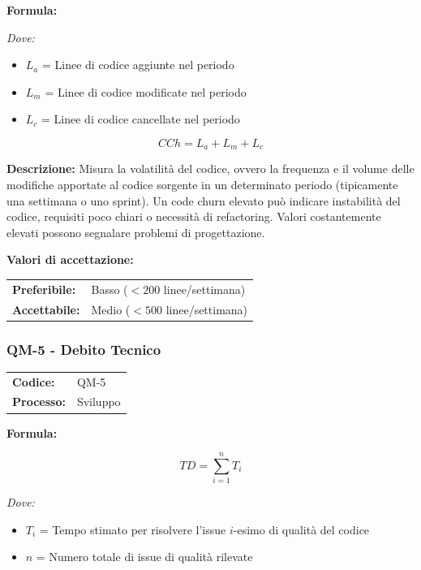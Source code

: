 \documentclass[a4paper,11pt,oneside]{scrartcl}
\begin{document}
\vspace{0.3cm}
\noindent\textbf{Formula:}

\noindent\textit{Dove:}
\begin{itemize}[leftmargin=1.5cm, topsep=0pt, itemsep=0pt]
    \item $L_a$ = Linee di codice aggiunte nel periodo
    \item $L_m$ = Linee di codice modificate nel periodo
    \item $L_c$ = Linee di codice cancellate nel periodo
\end{itemize}

\[
CCh = L_a + L_m + L_c
\]

\noindent\textbf{Descrizione:} Misura la volatilità del codice, ovvero la frequenza e il volume delle modifiche apportate al codice sorgente in un determinato periodo (tipicamente una settimana o uno sprint). Un code churn elevato può indicare instabilità del codice, requisiti poco chiari o necessità di refactoring{\scriptsize{}}. Valori costantemente elevati possono segnalare problemi di progettazione.

\vspace{0.2cm}
\noindent\textbf{Valori di accettazione:}
\vspace{0.1cm}

\noindent
\begin{tabular}{@{}ll@{}}
\textbf{Preferibile:} & Basso ($< 200$ linee/settimana) \\
\textbf{Accettabile:} & Medio ($< 500$ linee/settimana) \\
\end{tabular}

\subsubsection{QM-5 - Debito Tecnico}

\noindent
\begin{tabular}{@{}p{}p{}@{}}
\textbf{Codice:} & QM-5 \\
\textbf{Processo:} & Sviluppo \\
\end{tabular}

\vspace{0.3cm}
\noindent\textbf{Formula:}

\[
TD = \sum_{i=1}^{n} T_i
\]

\noindent\textit{Dove:}
\begin{itemize}[leftmargin=1.5cm, topsep=0pt, itemsep=0pt]
    \item $T_i$ = Tempo stimato per risolvere l'issue $i$-esimo di qualità del codice
    \item $n$ = Numero totale di issue di qualità rilevate
\end{itemize}
\end{document}
